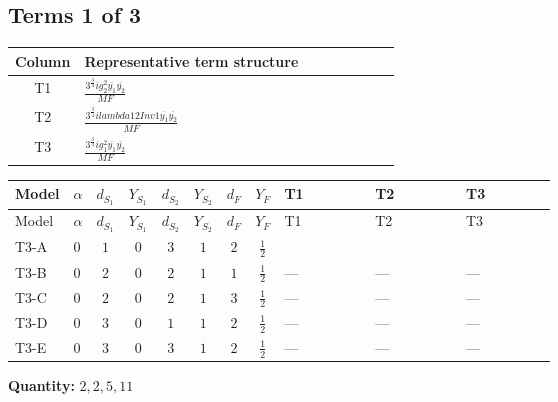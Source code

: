 \documentclass[8pt]{article}
\begin{document}
\begin{landscape}
\subsection*{Terms 1 of 3}
\begin{center}
\begin{tabular}{@{}c >{\raggedright\arraybackslash}p{0.82\linewidth}@{}}
\toprule
Column & Representative term structure \\
\midrule
T1 & \(\displaystyle \frac{3^{\frac{3}{4}} i g_{2}^{2} \overline{y_{1}} \overline{y_{2}}}{MF}\) \\
\midrule
T2 & \(\displaystyle \frac{3^{\frac{3}{4}} i lambda12Inv1 \overline{y_{1}} \overline{y_{2}}}{MF}\) \\
\midrule
T3 & \(\displaystyle \frac{3^{\frac{3}{4}} i g_{1}^{2} \overline{y_{1}} \overline{y_{2}}}{MF}\) \\
\midrule
\bottomrule
\end{tabular}
\end{center}
\smallskip
\tiny
\begin{longtable}{@{}llcccccc >{\raggedright\arraybackslash}p{0.21\linewidth} >{\raggedright\arraybackslash}p{0.21\linewidth} >{\raggedright\arraybackslash}p{0.21\linewidth}@{}}
\toprule
Model & $\alpha$ & $d_{S_1}$ & $Y_{S_1}$ & $d_{S_2}$ & $Y_{S_2}$ & $d_F$ & $Y_F$ & T1 & T2 & T3 \\
\midrule
\endfirsthead
\toprule
Model & $\alpha$ & $d_{S_1}$ & $Y_{S_1}$ & $d_{S_2}$ & $Y_{S_2}$ & $d_F$ & $Y_F$ & T1 & T2 & T3 \\
\midrule
\endhead
T3-A & $0$ & $1$ & $0$ & $3$ & $1$ & $2$ & $\frac{1}{2}$ & \scriptsize\adjustbox{max width=\linewidth}{$\begin{gathered} - \frac{11 \cdot 3^{\frac{3}{4}} i g_{2}^{2} \overline{y_{1}} \overline{y_{2}}}{8 MF}\end{gathered}$} & \scriptsize\adjustbox{max width=\linewidth}{$\begin{gathered} - \frac{3^{\frac{3}{4}} i lambda12Inv1 \overline{y_{1}} \overline{y_{2}}}{6 MF}\end{gathered}$} & \scriptsize\adjustbox{max width=\linewidth}{$\begin{gathered} - \frac{3^{\frac{3}{4}} i g_{1}^{2} \overline{y_{1}} \overline{y_{2}}}{8 MF}\end{gathered}$} \\
\midrule
T3-B & $0$ & $2$ & $0$ & $2$ & $1$ & $1$ & $\frac{1}{2}$ & --- & --- & --- \\
\midrule
T3-C & $0$ & $2$ & $0$ & $2$ & $1$ & $3$ & $\frac{1}{2}$ & --- & --- & --- \\
\midrule
T3-D & $0$ & $3$ & $0$ & $1$ & $1$ & $2$ & $\frac{1}{2}$ & --- & --- & --- \\
\midrule
T3-E & $0$ & $3$ & $0$ & $3$ & $1$ & $2$ & $\frac{1}{2}$ & --- & --- & --- \\
\midrule
\bottomrule
\end{longtable}
\clearpage
\noindent\textbf{Quantity: }$\mathrm{2,2,5,11}$\par\smallskip

\end{landscape}
\end{document}
